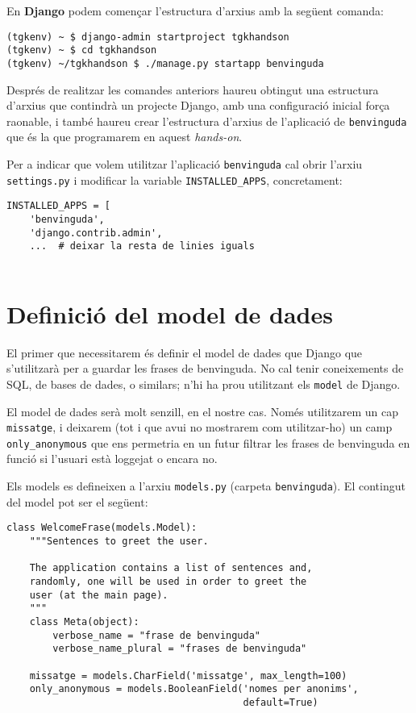 \documentclass[12pt,a4paper]{article}
\begin{document}
En \textbf{Django} podem començar l'estructura d'arxius amb la següent comanda:

\begin{verbatim}
(tgkenv) ~ $ django-admin startproject tgkhandson
(tgkenv) ~ $ cd tgkhandson
(tgkenv) ~/tgkhandson $ ./manage.py startapp benvinguda
\end{verbatim}

Després de realitzar les comandes anteriors haureu obtingut una estructura d'arxius que contindrà un projecte Django, amb una configuració inicial força raonable, i també haureu crear l'estructura d'arxius de l'aplicació de \verb+benvinguda+ que és la que programarem en aquest \emph{hands-on}.

Per a indicar que volem utilitzar l'aplicació \verb+benvinguda+ cal obrir l'arxiu \verb+settings.py+ i modificar la variable \verb+INSTALLED_APPS+, concretament:

\begin{lstlisting}
INSTALLED_APPS = [
    'benvinguda',
    'django.contrib.admin',
    ...  # deixar la resta de linies iguals
    
\end{lstlisting}

\section{Definició del model de dades}

El primer que necessitarem és definir el model de dades que Django que s'utilitzarà per a guardar les frases de benvinguda. No cal tenir coneixements de SQL, de bases de dades, o similars; n'hi ha prou utilitzant els \verb+model+ de Django.

El model de dades serà molt senzill, en el nostre cas. Només utilitzarem un cap \verb+missatge+, i deixarem (tot i que avui no mostrarem com utilitzar-ho) un camp \verb+only_anonymous+ que ens permetria en un futur filtrar les frases de benvinguda en funció si l'usuari està loggejat o encara no.

Els models es defineixen a l'arxiu \verb+models.py+ (carpeta \verb+benvinguda+). El contingut del model pot ser el següent:

\begin{lstlisting}
class WelcomeFrase(models.Model):
    """Sentences to greet the user.

    The application contains a list of sentences and, 
    randomly, one will be used in order to greet the 
    user (at the main page).
    """
    class Meta(object):
        verbose_name = "frase de benvinguda"
        verbose_name_plural = "frases de benvinguda"

    missatge = models.CharField('missatge', max_length=100)
    only_anonymous = models.BooleanField('nomes per anonims', 
                                         default=True)
\end{lstlisting}
\end{document}
